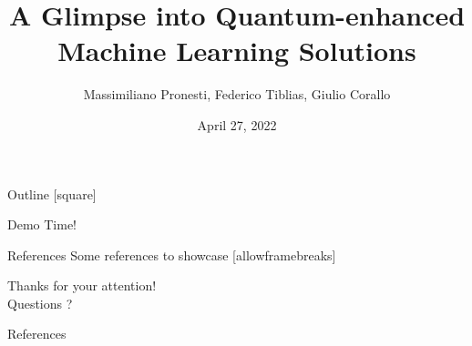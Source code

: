 \documentclass[10pt]{beamer}
\title{A Glimpse into Quantum-enhanced Machine Learning Solutions}
\date{April 27, 2022}
\author{
	Massimiliano Pronesti, 
	Federico Tiblias, 
	Giulio Corallo
}
\institute{Amadeus Knowledge Sharing Session}
\begin{document}
	
	\maketitle
	
	
	
	\begin{frame}[plain]{Outline}
		[square]
		\tableofcontents
	\end{frame}
	
	    
    
	
	
	
	\begin{frame}[standout]
		Demo Time!
	\end{frame}
	
	\begin{frame}{References}
		Some references to showcase [allowframebreaks] \cite{knuth92,ConcreteMath,Simpson,Er01,greenwade93}
	\end{frame}
	
    
	
	
	\begin{frame}[standout]
		Thanks for your attention!\\
		Questions ? ~\alert{\faSmileO}~
	\end{frame}
	
	
	\appendix
	
	\begin{frame}[allowframebreaks]{References}
		
		
	\end{frame}
	
\end{document}
